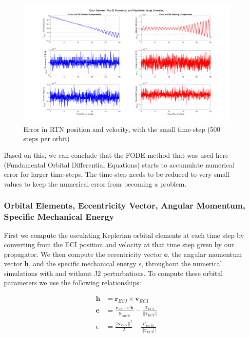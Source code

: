 \begin{figure}[H]
    \centering
    \includegraphics[width=0.75\linewidth]{sim/figures/comparing_rtn_large_timestep.png}
    \caption{Error in RTN position and velocity, with the small time-step (500 steps per orbit)}
    \label{fig:rtn_compare_small_timestep}
\end{figure}

Based on this, we can conclude that the FODE method that was used here (Fundamental Orbital Differential Equations) starts to accumulate numerical error for larger time-steps. The time-step needs to be reduced to very small values to keep the numerical error from becoming a problem.

\subsubsection{Orbital Elements, Eccentricity Vector, Angular Momentum, Specific Mechanical Energy} \label{sec:oe_compares}

First we compute the osculating Keplerian orbital elements at each time step by converting from the ECI position and velocity at that time step given by our propagator. We then compute the eccentricity vector $\boldsymbol{e}$, the angular momentum vector $\boldsymbol{h}$, and the specific mechanical energy $\epsilon$, throughout the numerical simulations with and without J2 perturbations. To compute these orbital parameters we use the following relationships:

\begin{align}
    \boldsymbol{h} &= \boldsymbol{r}_{ECI} \times \boldsymbol{v}_{ECI} \\
    \boldsymbol{e} &= \frac{\boldsymbol{v}_{ECI} \times \boldsymbol{h}}{\mu_{earth}} - \frac{\boldsymbol{r}_{ECI}}{||\boldsymbol{r}_{ECI}||} \\
    \epsilon &= \frac{||\boldsymbol{v}_{ECI}||^2}{2} - \frac{\mu_{earth}}{||\boldsymbol{r}_{ECI}||}
\end{align}

